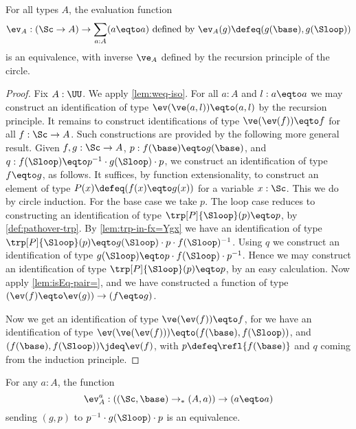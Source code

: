 \begin{theorem}\label{lem:freeloopspace}
For all types $A$, the evaluation function
\[
\ev_A : (\Sc\to A)\to \sum_{a:A}(a\eqto a)\text{~defined by~}
\ev_A(g)\defeq (g(\base),g(\Sloop))
\]
is an equivalence, with inverse $\ve_A$ defined by the recursion principle
of the circle.
\end{theorem}
\begin{proof}
Fix $A:\UU$. We apply \cref{lem:weq-iso}.
For all $a:A$ and $l:a\eqto a$ we may construct an identification of type $\ev(\ve(a,l))\eqto(a,l)$
by the recursion principle. It remains to construct identifications
of type $\ve(\ev(f))\eqto f$ for all $f:\Sc\to A$.  Such constructions are provided by
the following more general result.
Given $f,g:\Sc\to A$,
$p: f(\base)\eqto g(\base)$, and $q: f(\Sloop) \eqto p^{-1}\cdot g(\Sloop)\cdot p$,
we construct an identification of type $f\eqto g$, as follows.
It suffices, by function extensionality, to construct an element of
type $P(x)\defeq(f(x)\eqto g(x))$ for a variable $x:\Sc$.
This we do by circle induction.
For the base case we take $p$.
The loop case reduces to constructing an identification of type $\trp[P]{\Sloop}(p)\eqto p$, by \cref{def:pathover-trp}.
By \cref{lem:trp-in-fx=Ygx} we have an identification of type
$\trp[P]{\Sloop}(p)\eqto g(\Sloop)\cdot p \cdot f(\Sloop)^{-1}$.
Using $q$ we construct an identification of type $g(\Sloop) \eqto p\cdot f(\Sloop) \cdot p^{-1}$.
Hence we may construct an identification of type $\trp[P]{\Sloop}(p)\eqto p$, by an easy calculation.
Now apply \cref{lem:isEq-pair=}, and we have
constructed a function of type $(\ev(f)\eqto \ev(g)) \to (f\eqto g)$.

Now we get an identification of type $\ve(\ev(f))\eqto f$, for we have an identification of type
$\ev(\ve(\ev(f)))\eqto (f(\base),f(\Sloop))$, and $(f(\base),f(\Sloop))\jdeq\ev(f)$,
with $p\defeq\refl{f(\base)}$ and $q$ coming from the induction principle.
\end{proof}
\begin{corollary}\label{cor:circle-loopspace}
  For any $a:A$, the function
  \[\ev_A^a:((\Sc,\base)\to_* (A,a))\to (a\eqto a)\]
  sending $(g,p)$ to $p^{-1}\cdot g(\Sloop)\cdot p$ is an equivalence.
\end{corollary}
